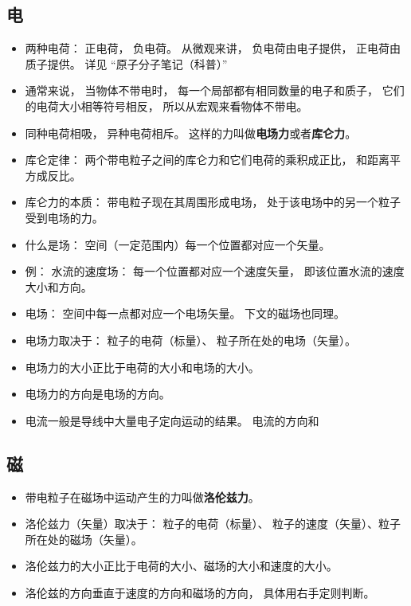 
\begin{issues}
\issueDraft
\end{issues}

\subsection{电}
\begin{itemize}
\item 两种电荷： 正电荷， 负电荷。 从微观来讲， 负电荷由电子提供， 正电荷由质子提供。 详见 “原子分子笔记（科普）”
\item 通常来说， 当物体不带电时， 每一个局部都有相同数量的电子和质子， 它们的电荷大小相等符号相反， 所以从宏观来看物体不带电。
\item 同种电荷相吸， 异种电荷相斥。 这样的力叫做\textbf{电场力}或者\textbf{库仑力}。
\item 库仑定律： 两个带电粒子之间的库仑力和它们电荷的乘积成正比， 和距离平方成反比。
\item 库仑力的本质： 带电粒子现在其周围形成电场， 处于该电场中的另一个粒子受到电场的力。
\item 什么是场： 空间（一定范围内）每一个位置都对应一个矢量。
\item 例： 水流的速度场： 每一个位置都对应一个速度矢量， 即该位置水流的速度大小和方向。
\item 电场： 空间中每一点都对应一个电场矢量。 下文的磁场也同理。
\item 电场力取决于：  粒子的电荷（标量）、 粒子所在处的电场（矢量）。
\item 电场力的大小正比于电荷的大小和电场的大小。
\item 电场力的方向是电场的方向。
\item 电流一般是导线中大量电子定向运动的结果。 电流的方向和
\end{itemize}

\subsection{磁}
\begin{itemize}
\item 带电粒子在磁场中运动产生的力叫做\textbf{洛伦兹力}。
\item 洛伦兹力（矢量）取决于： 粒子的电荷（标量）、 粒子的速度（矢量）、粒子所在处的磁场（矢量）。
\item 洛伦兹力的大小正比于电荷的大小、磁场的大小和速度的大小。
\item 洛伦兹的方向垂直于速度的方向和磁场的方向， 具体用右手定则判断。
\end{itemize}
